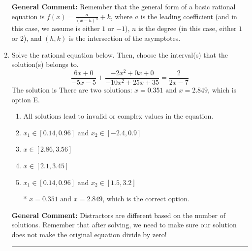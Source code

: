 \documentclass{extbook}[14pt]
\newcommand{\litem}[1]{\item #1

\rule{\textwidth}{0.4pt}}
\begin{document}
\begin{enumerate}
{\textbf{General Comment:} Remember that the general form of a basic rational equation is $ f(x) = \frac{a}{(x-h)^n} + k$, where $a$ is the leading coefficient (and in this case, we assume is either $1$ or $-1$), $n$ is the degree (in this case, either $1$ or $2$), and $(h, k)$ is the intersection of the asymptotes.
}
\litem{
Solve the rational equation below. Then, choose the interval(s) that the solution(s) belongs to.
\[ \frac{6x + 0}{-5x -5} + \frac{-2x^{2} +0 x + 0}{-10x^{2} +25 x + 35} = \frac{2}{2x -7} \]The solution is \( \text{There are two solutions: } x = 0.351 \text{ and } x = 2.849 \), which is option E.\begin{enumerate}[label=\Alph*.]
\item \( \text{All solutions lead to invalid or complex values in the equation.} \)


\item \( x_1 \in [0.14, 0.96] \text{ and } x_2 \in [-2.4,0.9] \)


\item \( x \in [2.86,3.56] \)


\item \( x \in [2.1,3.45] \)


\item \( x_1 \in [0.14, 0.96] \text{ and } x_2 \in [1.5,3.2] \)

* $x = 0.351 \text{ and } x = 2.849$, which is the correct option.
\end{enumerate}

\textbf{General Comment:} Distractors are different based on the number of solutions. Remember that after solving, we need to make sure our solution does not make the original equation divide by zero!
}
\end{enumerate}
\end{document}
